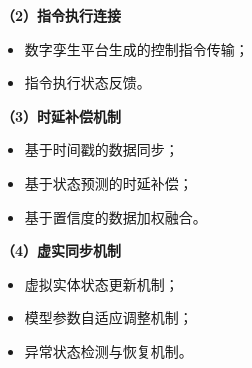\textbf{（2）指令执行连接}

\begin{itemize}
    \item 数字孪生平台生成的控制指令传输；
    \item 指令执行状态反馈。
\end{itemize}

\textbf{（3）时延补偿机制}

\begin{itemize}
    \item 基于时间戳的数据同步；
    \item 基于状态预测的时延补偿；
    \item 基于置信度的数据加权融合。
\end{itemize}

\textbf{（4）虚实同步机制}

\begin{itemize}
    \item 虚拟实体状态更新机制；
    \item 模型参数自适应调整机制；
    \item 异常状态检测与恢复机制。
\end{itemize}

